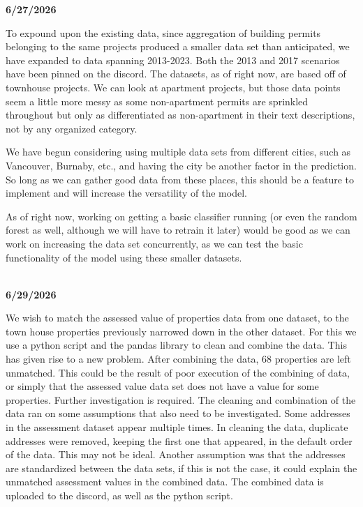 \documentclass{article}
\begin{document}
        \begin{flushleft}
            \textbf{6/27/2026}
        \end{flushleft}

        To expound upon the existing data, since aggregation of building permits belonging to the same projects produced a smaller data set than anticipated, we have expanded to data spanning 2013-2023. Both the 2013 and 2017 scenarios have been pinned on the discord. The datasets, as of right now, are based off of townhouse projects. We can look at apartment projects, but those data points seem a little more messy as some non-apartment permits are sprinkled throughout but only as differentiated as non-apartment in their text descriptions, not by any organized category. 

        We have begun considering using multiple data sets from different cities, such as Vancouver, Burnaby, etc., and having the city be another factor in the prediction. So long as we can gather good data from these places, this should be a feature to implement and will increase the versatility of the model. 

        As of right now, working on getting a basic classifier running (or even the random forest as well, although we will have to retrain it later) would be good as we can work on increasing the data set concurrently, as we can test the basic functionality of the model using these smaller datasets.
\\\\
        \begin{flushleft}
            \textbf{6/29/2026}
        \end{flushleft}

        We wish to match the assessed value of properties data from one dataset, to the town house properties previously narrowed down in the other dataset. For this we use a python script and the pandas library to clean and combine the data. This has given rise to a new problem. After combining the data, 68 properties are left unmatched. This could be the result of poor execution of the combining of data, or simply that the assessed value data set does not have a value for some properties. Further investigation is required. The cleaning and combination of the data ran on some assumptions that also need to be investigated. Some addresses in the assessment dataset appear multiple times. In cleaning the data, duplicate addresses were removed, keeping the first one that appeared, in the default order of the data. This may not be ideal. Another assumption was that the addresses are standardized between the data sets, if this is not the case, it could explain the unmatched assessment values in the combined data. The combined data is uploaded to the discord, as well as the python script. 
\end{document}
